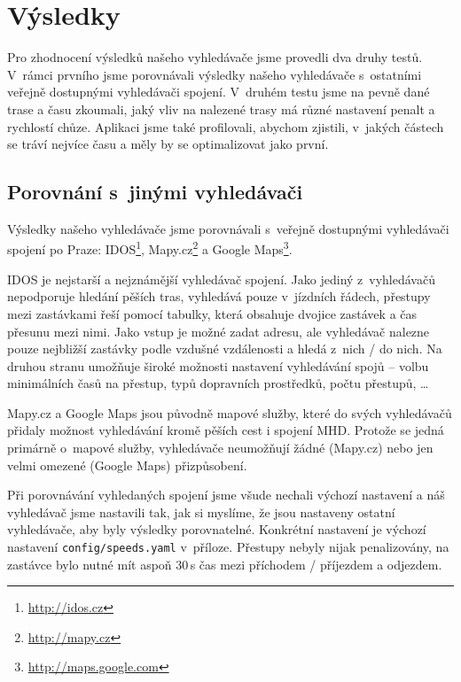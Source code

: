 \chapter{Výsledky}
\label{ch:vysledky}
Pro zhodnocení výsledků našeho vyhledávače jsme provedli dva druhy testů.
V~rámci prvního jsme porovnávali výsledky našeho vyhledávače s~ostatními veřejně
dostupnými vyhledávači spojení. V~druhém testu jsme na pevně dané trase a času
zkoumali, jaký vliv na nalezené trasy má různé nastavení penalt a rychlostí
chůze. Aplikaci jsme také profilovali, abychom zjistili, v~jakých částech se
tráví nejvíce času a měly by se optimalizovat jako první.

\section{Porovnání s~jinými vyhledávači}
Výsledky našeho vyhledávače jsme porovnávali s~veřejně dostupnými vyhledávači
spojení po Praze: IDOS\footnote{\url{http://idos.cz}},
Mapy.cz\footnote{\url{http://mapy.cz}} a Google
Maps\footnote{\url{http://maps.google.com}}. 

IDOS je nejstarší a nejznámější vyhledávač spojení. Jako jediný z~vyhledávačů
nepodporuje hledání pěších tras, vyhledává pouze v~jízdních řádech, přestupy
mezi zastávkami řeší pomocí tabulky, která obsahuje dvojice zastávek a čas
přesunu mezi nimi. Jako vstup je možné zadat adresu, ale vyhledávač nalezne
pouze nejbližší zastávky podle vzdušné vzdálenosti a hledá z~nich / do nich. 
Na druhou stranu umožňuje široké možnosti nastavení vyhledávání spojů -- volbu
minimálních časů na přestup, typů dopravních prostředků, počtu přestupů, \dots

Mapy.cz a Google Maps jsou původně mapové služby, které do svých vyhledávačů
přidaly možnost vyhledávání kromě pěších cest i spojení MHD. Protože se jedná
primárně o~mapové služby, vyhledávače neumožňují žádné (Mapy.cz) nebo jen velmi
omezené (Google Maps) přizpůsobení. 

Při porovnávání vyhledaných spojení jsme všude nechali výchozí nastavení a náš
vyhledávač jsme nastavili tak, jak si myslíme, že jsou nastaveny ostatní
vyhledávače, aby byly výsledky porovnatelné. Konkrétní nastavení je výchozí
nastavení {\tt config/speeds.yaml} v~příloze. Přestupy nebyly nijak
penalizovány, na zastávce bylo nutné mít aspoň 30\,s čas mezi příchodem /
příjezdem a odjezdem.

